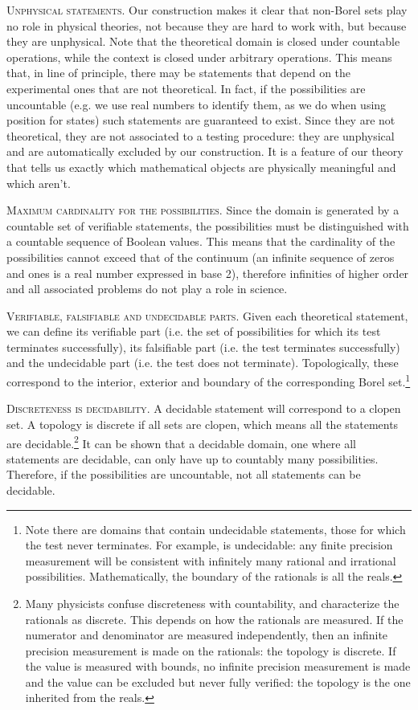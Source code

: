 \documentclass[10pt,twocolumn, nofootinbib]{revtex4-1}
\newcommand\partitle[1]{\textsc{#1}.}
\begin{document}
\partitle{Unphysical statements} Our construction makes it clear that non-Borel sets play no role in physical theories, not because they are hard to work with, but because they are unphysical. Note that the theoretical domain is closed under countable operations, while the context is closed under arbitrary operations. This means that, in line of principle, there may be statements that depend on the experimental ones that are not theoretical.  In fact, if the possibilities are uncountable (e.g. we use real numbers to identify them, as we do when using position for states) such statements are guaranteed to exist. Since they are not theoretical, they are not associated to a testing procedure: they are unphysical and are automatically excluded by our construction. It is a feature of our theory that tells us exactly which mathematical objects are physically meaningful and which aren't.

\partitle{Maximum cardinality for the possibilities} Since the domain is generated by a countable set of verifiable statements, the possibilities must be distinguished with a countable sequence of Boolean values. This means that the cardinality of the possibilities cannot exceed that of the continuum (an infinite sequence of zeros and ones is a real number expressed in base 2), therefore infinities of higher order and all associated problems do not play a role in science.

\partitle{Verifiable, falsifiable and undecidable parts} Given each theoretical statement, we can define its verifiable part (i.e. the set of possibilities for which its test terminates successfully), its falsifiable part (i.e. the test terminates successfully) and the undecidable part (i.e. the test does not terminate). Topologically, these correspond to the interior, exterior and boundary of the corresponding Borel set.\footnote{Note there are domains that contain undecidable statements, those for which the test never terminates. For example,  is undecidable: any finite precision measurement will be consistent with infinitely many rational and irrational possibilities. Mathematically, the boundary of the rationals is all the reals.}

\partitle{Discreteness is decidability} A decidable statement will correspond to a clopen set. A topology is discrete if all sets are clopen, which means all the statements are decidable.\footnote{Many physicists confuse discreteness with countability, and characterize the rationals as discrete. This depends on how the rationals are measured. If the numerator and denominator are measured independently, then an infinite precision measurement is made on the rationals: the topology is discrete. If the value is measured with bounds, no infinite precision measurement is made and the value can be excluded but never fully verified: the topology is the one inherited from the reals.} It can be shown that a decidable domain, one where all statements are decidable, can only have up to countably many possibilities. Therefore, if the possibilities are uncountable, not all statements can be decidable.
\end{document}
